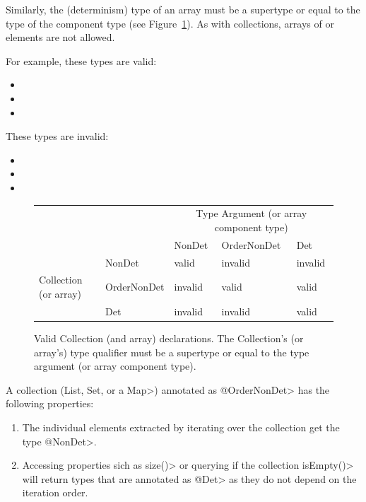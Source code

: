 Similarly, the (determinism) type of an array must be a supertype or equal to
the type of the component type (see Figure~\ref{fig-determinism-collections}).
As with collections,  arrays of  or 
elements are not allowed.

For example, these types are valid:
\begin{itemize}
    \item {}
    \item {}
    \item {}
\end{itemize}

These types are invalid:
\begin{itemize}
    \item {}
    \item {}
    \item {}
\end{itemize}

\begin{figure}
    \centering
    \begin{tabular}{|l|l|l|l|l|}
        \cline{3-5}
        \multicolumn{2}{c|}{~}  &  \multicolumn{3}{c|}{Type Argument (or array component type)} \\ \cline{3-5}
        \multicolumn{2}{c|}{~}  & NonDet     & OrderNonDet & Det \\ \hline
        & NonDet      &   valid    &  invalid    & invalid  \\ \cline{2-5}
        Collection (or array)   & OrderNonDet &   invalid  &  valid      & valid  \\ \cline{2-5}
        & Det         &   invalid  &  invalid    & valid      \\ \hline
    \end{tabular}
    \caption{Valid Collection (and array) declarations.  The Collection's (or array's) type qualifier
        must be a supertype or equal to the type argument (or array component type).}
    \label{fig-determinism-collections}
\end{figure}

A collection (\<List, Set, or a Map>) annotated as \<@OrderNonDet> has the following properties:
\begin{enumerate}
    \item The individual elements extracted by iterating over the collection get the type \<@NonDet>.
    \item Accessing properties sich as \<size()> or querying if the collection \<isEmpty()> will return types
    that are annotated as \<@Det> as they do not depend on the iteration order. 
\end{enumerate}

